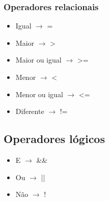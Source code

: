 \documentclass[12pt,a4paper]{article} %
\begin{document}
		\subsubsection{Operadores relacionais}
			\begin{itemize}
				\item Igual $\rightarrow$ =
				\item Maior $\rightarrow$ >
				\item Maior ou igual $\rightarrow$ >=
				\item Menor $\rightarrow$ <
				\item Menor ou igual $\rightarrow$ <=
				\item Diferente $\rightarrow$ !=
			\end{itemize}
		\subsection{Operadores lógicos}
			\begin{itemize}
				\item E $\rightarrow$ \&\&
				\item Ou $\rightarrow$ ||
				\item Não $\rightarrow$ !
			\end{itemize}
\end{document}
